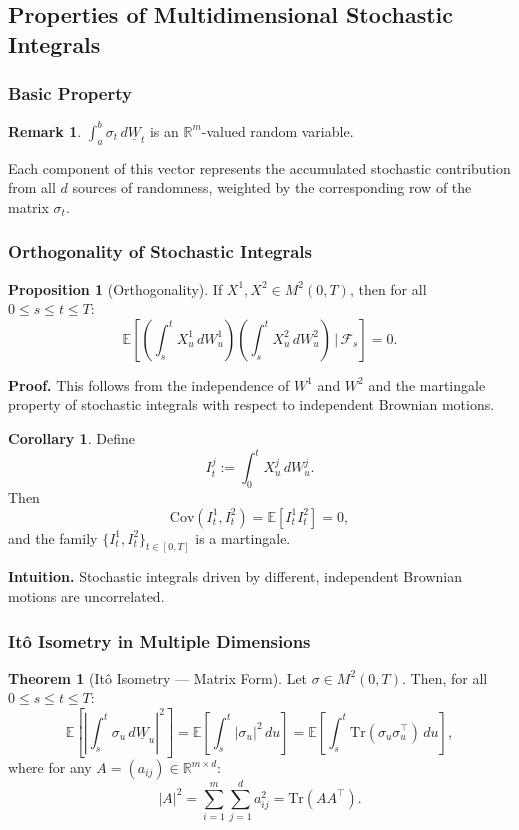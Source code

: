 \documentclass[12pt,a4paper]{article}
\theoremstyle{definition}
\newtheorem{theorem}{Theorem}[section]
\newtheorem{proposition}{Proposition}[section]
\newtheorem{corollary}{Corollary}[section]
\newtheorem{remark}{Remark}[section]
\newcommand{\R}{\mathbb{R}}
\newcommand{\E}{\mathbb{E}}
\begin{document}
\subsection{Properties of Multidimensional Stochastic Integrals}

\subsubsection{Basic Property}

\begin{remark}
$\displaystyle \int_a^b \sigma_t \, d\underline{W}_t$ is an $\R^m$-valued random variable.
\end{remark}

Each component of this vector represents the accumulated stochastic contribution from all $d$ sources of randomness, weighted by the corresponding row of the matrix $\sigma_t$.

\subsubsection{Orthogonality of Stochastic Integrals}

\begin{proposition}[Orthogonality]
If $X^1, X^2 \in M^2(0, T)$, then for all $0 \leq s \leq t \leq T$:
\[
\E\left[\left(\int_s^t X_u^1 \, dW_u^1\right)\left(\int_s^t X_u^2 \, dW_u^2\right) \,\Big|\, \mathcal{F}_s\right] = 0.
\]
\end{proposition}

\textbf{Proof.} This follows from the independence of $W^1$ and $W^2$ and the martingale property of stochastic integrals with respect to independent Brownian motions.

\begin{corollary}
Define
\[
I_t^j := \int_0^t X_u^j \, dW_u^j.
\]
Then
\[
\text{Cov}(I_t^1, I_t^2) = \E[I_t^1 I_t^2] = 0,
\]
and the family $\{I_t^1, I_t^2\}_{t \in [0,T]}$ is a martingale.
\end{corollary}

\textbf{Intuition.} Stochastic integrals driven by different, independent Brownian motions are uncorrelated.

\subsubsection{Itô Isometry in Multiple Dimensions}

\begin{theorem}[Itô Isometry — Matrix Form]
Let $\sigma \in M^2(0, T)$. Then, for all $0 \leq s \leq t \leq T$:
\[
\E\left[\left|\int_s^t \sigma_u \, d\underline{W}_u\right|^2\right] = \E\left[\int_s^t |\sigma_u|^2 \, du\right] = \E\left[\int_s^t \text{Tr}(\sigma_u \sigma_u^\top) \, du\right],
\]
where for any $A = (a_{ij}) \in \R^{m \times d}$:
\[
|A|^2 = \sum_{i=1}^m \sum_{j=1}^d a_{ij}^2 = \text{Tr}(AA^\top).
\]
\end{theorem}
\end{document}
